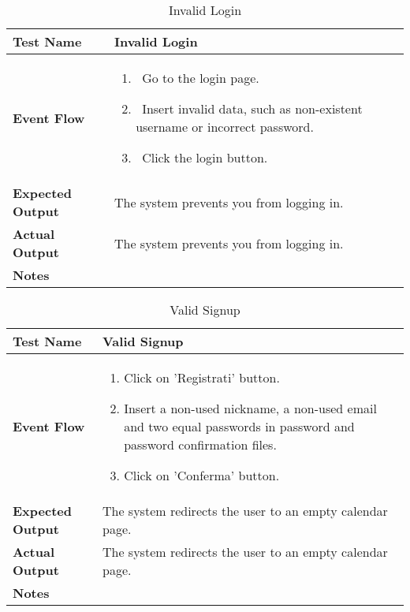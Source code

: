 \begin{table}[h]	
\centering
\def\arraystretch{1.5}
\begin{tabular}{|m{7cm}|m{7cm}|}
	\hline
	\textbf{Test Name}            &  Invalid Login  \\ \hline
	\textbf{Event Flow}             &  
		\begin{enumerate}
				\item~Go to the login page.
				\item~Insert invalid data, such as non-existent username or incorrect password.
				\item~Click the login button.
		\end{enumerate}
		 \\ \hline
	\textbf{Expected Output}  &  The system prevents you from logging in.  \\ \hline
	\textbf{Actual Output}       &  The system prevents you from logging in.   \\ \hline
	\textbf{Notes} & \\ \hline
\end{tabular}
\caption{Invalid Login}
\end{table}


\begin{table}[h]	
	\centering
	\def\arraystretch{1.5}
	\begin{tabular}{|m{7cm}|m{7cm}|}
		\hline
		\textbf{Test Name}            &  Valid Signup  \\ \hline
		\textbf{Event Flow}             &  
		\begin{enumerate}
			\item Click on 'Registrati' button.
			\item Insert a non-used nickname, a non-used email and two equal passwords in password and password confirmation files.
			\item Click on 'Conferma' button.
		\end{enumerate} \\ \hline
		\textbf{Expected Output}  &  The system redirects the user to an empty calendar page.   \\ \hline
		\textbf{Actual Output}       & The system redirects the user to an empty calendar page.    \\ \hline
		\textbf{Notes} & \\ \hline
	\end{tabular}
	\caption{Valid Signup}
\end{table}


